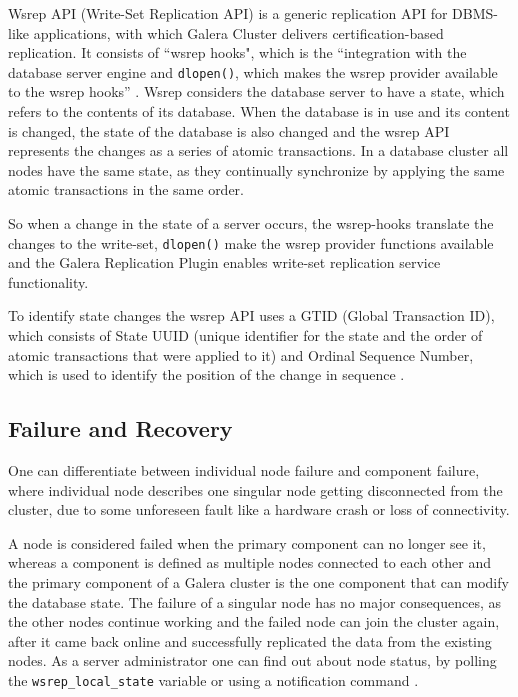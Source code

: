 \documentclass{sig-alternate}
\begin{document}
Wsrep API (Write-Set Replication API) is a generic replication API for DBMS-like applications, with which Galera Cluster delivers certification-based replication. It consists of “wsrep hooks", which is the “integration with the database server engine and \texttt{dlopen()}, which makes the wsrep provider available to the wsrep hooks” \cite{wsrepapi}. Wsrep considers the database server to have a state, which refers to the contents of its database. When the database is in use and its content is changed, the state of the database is also changed and the wsrep API represents the changes as a series of atomic transactions. In a database cluster all nodes have the same state, as they continually synchronize by applying the same atomic transactions in the same order.

So when a change in the state of a server occurs, the wsrep-hooks translate the changes to the write-set, \texttt{dlopen()} make the wsrep provider functions available and the Galera Replication Plugin enables write-set replication service functionality.

To identify state changes the wsrep API uses a GTID (Global Transaction ID), which consists of State UUID (unique identifier for the state and the order of atomic transactions that were applied to it) and Ordinal Sequence Number, which is used to identify the position of the change in sequence \cite{wsrepapi}.

\subsection{Failure and Recovery}

One can differentiate between individual node failure and component failure, where individual node describes one singular node getting disconnected from the cluster, due to some unforeseen fault like a hardware crash or loss of connectivity.

A node is considered failed when the primary component can no longer see it, whereas a component is defined as multiple nodes connected to each other and the primary component of a Galera cluster is the one component that can modify the database state. The failure of a singular node has no major consequences, as the other nodes continue working and the failed node can join the cluster again, after it came back online and successfully replicated the data from the existing nodes. As a server administrator one can find out about node status, by polling the \texttt{wsrep\_local\_state} variable or using a notification command \cite{galerarecovery}.
\end{document}
